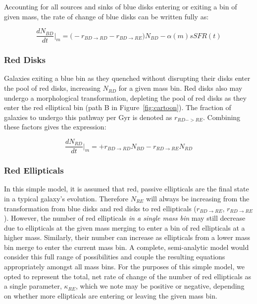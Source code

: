 \documentclass[useAMS,usenatbib]{mn2e}
\begin{document}
Accounting for all sources and sinks of blue disks entering or exiting a bin of given mass, the rate of change of blue disks can be written fully as:

\begin{equation}
\frac{dN_{BD}}{dt}\Big\rvert_{m} = \Big(-r_{BD \rightarrow RD} - r_{BD\rightarrow RE}\Big)N_{BD} -\alpha(m) sSFR(t)
\label{eqn:BD}
\end{equation}

\subsubsection{Red Disks}
Galaxies exiting a blue bin as they quenched without disrupting their disks enter the pool of red disks, increasing $N_{RD}$ for a given mass bin. Red disks also may undergo a morphological transformation, depleting the pool of red disks as they enter the red elliptical bin (path B in Figure~\ref{fig:cartoon}). The fraction of galaxies to undergo this pathway per Gyr is denoted as $r_{RD->RE}$. Combining these factors gives the expression: 

\begin{equation}
\frac{dN_{RD}}{dt}\Big\rvert_{m} = + r_{BD \rightarrow RD}N_{BD} - r_{RD \rightarrow RE}N_{RD}
\label{eqn:RD}
\end{equation}

\subsubsection{Red Ellipticals}
In this simple model, it is assumed that red, passive ellipticals are the final state in a typical galaxy's evolution. Therefore $N_{RE}$ will always be increasing from the transformation from blue disks and red disks to red ellipticals ($r_{BD \rightarrow RE}$, $r_{RD \rightarrow RE}$). However, the number of red ellipticals \emph{in a single mass bin} may still decrease due to ellipticals at the given mass merging to enter a bin of red ellipticals at a higher mass. Similarly, their number can increase as ellipticals from a lower mass bin merge to enter the current mass bin. A complete, semi-analytic model would consider this full range of possibilities and couple the resulting equations appropriately amongst all mass bins. For the purposes of this simple model, we opted to represent the total, net rate of change of the number of red ellipticals as a single parameter, $\kappa_{RE}$, which we note may be positive or negative, depending on whether more ellipticals are entering or leaving the given mass bin. 
\end{document}
